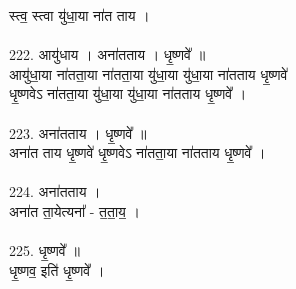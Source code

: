 स्त्व॒ स्त्वा यु॑धा॒या ना॑त ताय ।\\
\\
222. आयु॑धाय । अना॑तताय । धृ॒ष्णवे᳚ ॥\\
आयु॑धा॒या ना॑तता॒या ना॑तता॒या यु॑धा॒या यु॑धा॒या ना॑तताय धृ॒ष्णवे॑\\
धृ॒ष्णवेऽ ना॑तता॒या यु॑धा॒या यु॑धा॒या ना॑तताय धृ॒ष्णवे᳚ ।\\
\\
223. अना॑तताय । धृ॒ष्णवे᳚ ॥\\
अना॑त ताय धृ॒ष्णवे॑ धृ॒ष्णवेऽ ना॑तता॒या ना॑तताय धृ॒ष्णवे᳚ ।\\
\\
224. अना॑तताय ।\\
अना॑त ता॒येत्यना᳚ - त॒ता॒य॒ ।\\
\\
225. धृ॒ष्णवे᳚ ॥\\
धृ॒ष्णव॒ इति॑ धृ॒ष्णवे᳚ ।\\
\\
